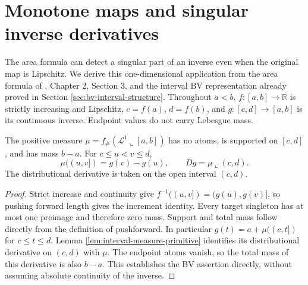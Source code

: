 \chapter{Monotone maps and singular inverse derivatives}\label{sec:monotone-inverse-derivatives}
The area formula can detect a singular part of an inverse even when the original map is Lipschitz. We derive this one-dimensional application from the area formula of \cite{Sim18}, Chapter 2, Section 3, and the interval BV representation already proved in Section \ref{sec:bv-interval-structure}. Throughout $a<b$, $f:[a,b]\to\mathbb R$ is strictly increasing and Lipschitz, $c=f(a)$, $d=f(b)$, and $g:[c,d]\to[a,b]$ is its continuous inverse. Endpoint values do not carry Lebesgue mass.

\begin{lemma}\label{lem:monotone-inverse-pushforward}
The positive measure $\mu=f_\#(\mathcal L^1\llcorner[a,b])$ has no atoms, is supported on $[c,d]$, and has mass $b-a$. For $c\leq u<v\leq d$,
\[
 \mu((u,v])=g(v)-g(u),
 \qquad Dg=\mu\llcorner(c,d).
\]
The distributional derivative is taken on the open interval $(c,d)$.
\end{lemma}
\begin{proof}
Strict increase and continuity give $f^{-1}((u,v])=(g(u),g(v)]$, so pushing forward length gives the increment identity. Every target singleton has at most one preimage and therefore zero mass. Support and total mass follow directly from the definition of pushforward. In particular $g(t)=a+\mu((c,t])$ for $c\leq t\leq d$. Lemma \ref{lem:interval-measure-primitive} identifies its distributional derivative on $(c,d)$ with $\mu$. The endpoint atoms vanish, so the total mass of this derivative is also $b-a$. This establishes the BV assertion directly, without assuming absolute continuity of the inverse.
\end{proof}

